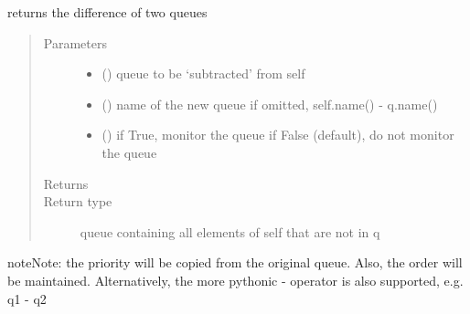 \documentclass[letterpaper,10pt,english]{sphinxmanual}
\begin{document}
\begin{fulllineitems}
\begin{fulllineitems}
\begin{quote}
\begin{description}
\end{description}\end{quote}

\end{fulllineitems}


\begin{fulllineitems}
\label{\detokenize{Reference:salabim.Queue.difference}}
returns the difference of two queues
\begin{quote}\begin{description}
\item[{Parameters}] \leavevmode\begin{itemize}
\item {} 
 ({\hyperref[\detokenize{Reference:salabim.Queue}]{}}) \textendash{} queue to be ‘subtracted’ from self

\item {} 
 () \textendash{} name of the  new queue 
if omitted, self.name() - q.name()

\item {} 
 () \textendash{} if True, monitor the queue 
if False (default), do not monitor the queue

\end{itemize}

\item[{Returns}] \leavevmode


\item[{Return type}] \leavevmode
queue containing all elements of self that are not in q

\end{description}\end{quote}

\begin{sphinxadmonition}{note}{Note:}
the priority will be copied from the original queue.
Also, the order will be maintained. 
Alternatively, the more pythonic - operator is also supported, e.g. q1 - q2
\end{sphinxadmonition}


\end{fulllineitems}
\end{fulllineitems}
\end{document}
